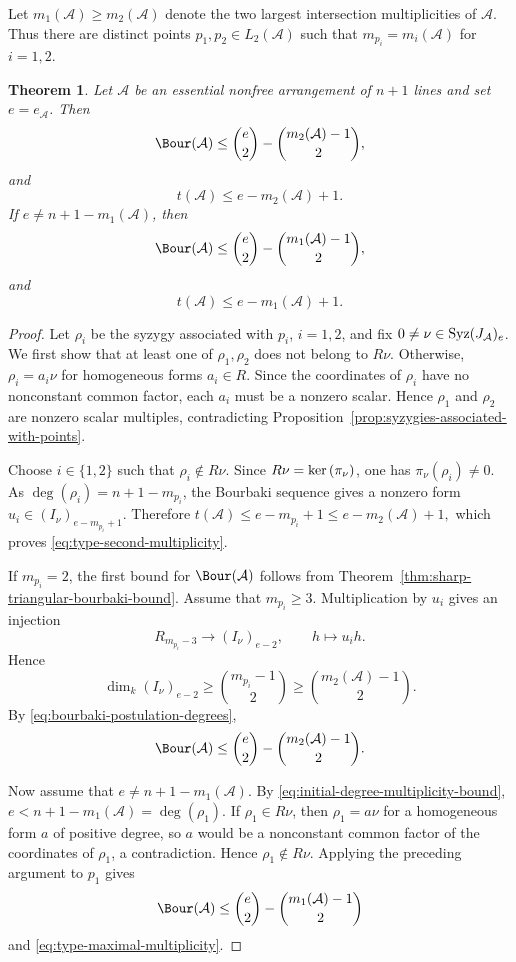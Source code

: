 \documentclass[11pt]{amsart}   %
\newtheorem{Theorem}{Theorem}[section]
\theoremstyle{definition}
\def\ker{{\rm ker}\,}
\def\syz{\mbox{\rm Syz}}
\def\A{{\mathcal A}}
\begin{document}
Let $m_1(\A)\geq m_2(\A)$ denote the two largest intersection multiplicities of $\A$. Thus there are distinct points $p_1,p_2\in L_2(\A)$ such that $m_{p_i}=m_i(\A)$ for $i=1,2$.
\begin{Theorem}
\label{thm:upper-bound-line-arrangements}
Let $\A$ be an essential nonfree arrangement of $n+1$ lines and set $e=e_\A$. Then
\[
\Bour(\A)\leq
\binom e2-\binom{m_2(\A)-1}{2},
\]
and
\begin{equation}
\label{eq:type-second-multiplicity}
t(\A)\leq e-m_2(\A)+1.
\end{equation}
If $e\neq n+1-m_1(\A)$, then
\[
\Bour(\A)\leq
\binom e2-\binom{m_1(\A)-1}{2},
\]
and
\begin{equation}
\label{eq:type-maximal-multiplicity}
t(\A)\leq e-m_1(\A)+1.
\end{equation}
\end{Theorem}
\begin{proof}
Let $\rho_i$ be the syzygy associated with $p_i$, $i=1,2$, and fix $0\neq\nu\in\syz(J_\A)_e$. We first show that at least one of $\rho_1,\rho_2$ does not belong to $R\nu$. Otherwise, $\rho_i=a_i\nu$ for homogeneous forms $a_i\in R$. Since the coordinates of $\rho_i$ have no nonconstant common factor, each $a_i$ must be a nonzero scalar. Hence $\rho_1$ and $\rho_2$ are nonzero scalar multiples, contradicting Proposition~\ref{prop:syzygies-associated-with-points}.

Choose $i\in\{1,2\}$ such that $\rho_i\notin R\nu$. Since $R\nu=\ker(\pi_\nu)$, one has $\pi_\nu(\rho_i)\neq0$. As $\deg(\rho_i)=n+1-m_{p_i}$, the Bourbaki sequence gives a nonzero form $u_i\in(I_\nu)_{e-m_{p_i}+1}.$ Therefore $t(\A)\leq e-m_{p_i}+1\leq e-m_2(\A)+1,$ which proves \eqref{eq:type-second-multiplicity}.

If $m_{p_i}=2$, the first bound for $\Bour(\A)$ follows from Theorem~\ref{thm:sharp-triangular-bourbaki-bound}. Assume that $m_{p_i}\geq3$. Multiplication by $u_i$ gives an injection
\[
R_{m_{p_i}-3}\longrightarrow(I_\nu)_{e-2},
\qquad h\longmapsto u_ih.
\]
Hence
\[
\dim_k(I_\nu)_{e-2} \geq\binom{m_{p_i}-1}{2} \geq\binom{m_2(\A)-1}{2}.
\]
By \eqref{eq:bourbaki-postulation-degrees},
\[
\Bour(\A)
\leq
\binom e2-\binom{m_2(\A)-1}{2}.
\]

Now assume that $e\neq n+1-m_1(\A)$. By \eqref{eq:initial-degree-multiplicity-bound}, $e<n+1-m_1(\A)=\deg(\rho_1)$. If $\rho_1\in R\nu$, then $\rho_1=a\nu$ for a homogeneous form $a$ of positive degree, so $a$ would be a nonconstant common factor of the coordinates of $\rho_1$, a contradiction. Hence $\rho_1\notin R\nu$. Applying the preceding argument to $p_1$ gives
\[
\Bour(\A)
\leq
\binom e2-\binom{m_1(\A)-1}{2}
\]
and \eqref{eq:type-maximal-multiplicity}.
\end{proof}
\end{document}
